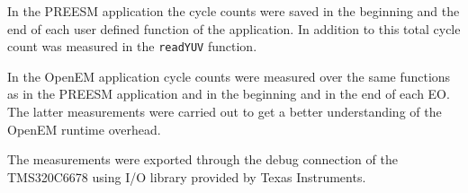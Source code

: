 In the PREESM application the cycle counts were saved in the beginning and the
end of each user defined function of the application. In addition to this total
cycle count was measured in the \texttt{readYUV} function.

In the OpenEM application cycle counts were measured over the same functions as
in the PREESM application and in the beginning and in the end of each EO. The
latter measurements were carried out to get a better understanding of the OpenEM
runtime overhead.

The measurements were exported through the debug connection of the TMS320C6678
using I/O library provided by Texas Instruments.
